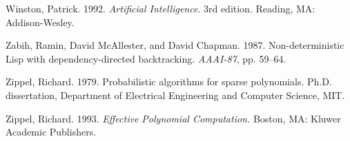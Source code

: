 {Winston, Patrick. 1992. {\em Artificial Intelligence}.  3rd edition.
Reading, MA: Addison-Wesley.

Zabih, Ramin, David McAllester, and David Chapman.  1987.
Non-deterministic Lisp with dependency-directed backtracking.
{\em AAAI-87}, pp. 59--64.

Zippel, Richard.  1979.  Probabilistic algorithms for sparse
polynomials.  Ph.D. dis\-ser\-ta\-tion, Department of Electrical Engineering
and Computer Science, MIT.

Zippel, Richard.  1993.  {\em Effective Polynomial Computation.}
Boston, MA: Kluwer Academic Publishers.
}
